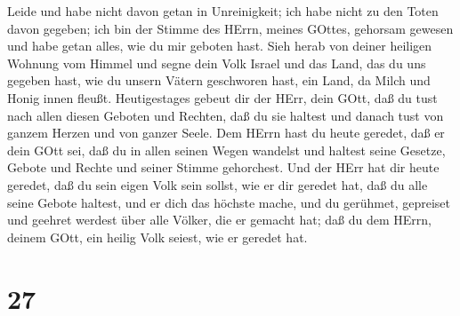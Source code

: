 Leide und habe nicht davon getan in Unreinigkeit; ich habe nicht zu den
Toten davon gegeben; ich bin der Stimme des HErrn, meines GOttes,
gehorsam gewesen und habe getan alles, wie du mir geboten hast.
 Sieh herab von deiner heiligen Wohnung vom Himmel und
segne dein Volk Israel und das Land, das du uns gegeben hast, wie du
unsern Vätern geschworen hast, ein Land, da Milch und Honig innen
fleußt.  Heutigestages gebeut dir der HErr, dein GOtt, daß
du tust nach allen diesen Geboten und Rechten, daß du sie haltest und
danach tust von ganzem Herzen und von ganzer Seele.  Dem
HErrn hast du heute geredet, daß er dein GOtt sei, daß du in allen
seinen Wegen wandelst und haltest seine Gesetze, Gebote und Rechte und
seiner Stimme gehorchest.  Und der HErr hat dir heute
geredet, daß du sein eigen Volk sein sollst, wie er dir geredet hat, daß
du alle seine Gebote haltest,  und er dich das höchste
mache, und du gerühmet, gepreiset und geehret werdest über alle Völker,
die er gemacht hat; daß du dem HErrn, deinem GOtt, ein heilig Volk
seiest, wie er geredet hat.

\hypertarget{section-26}{%
\section{27}\label{section-26}}

